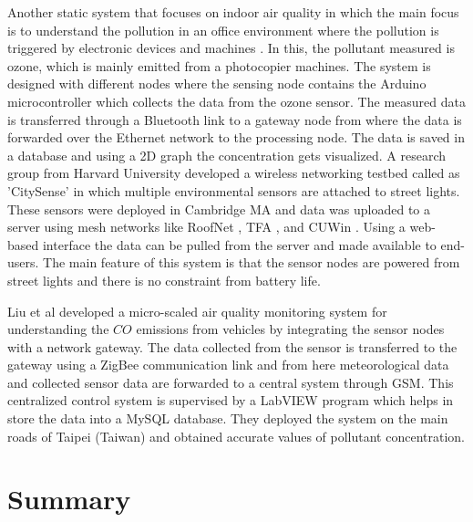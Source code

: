 Another static system that focuses on indoor air quality in which the main focus is to understand the pollution in an office environment where the pollution is triggered by electronic devices and machines \cite{Firdhous2017}. In this, the pollutant measured is ozone, which is mainly emitted from a photocopier machines. The system is designed with different nodes where the sensing node contains the Arduino microcontroller which collects the data from the ozone sensor. The measured data is transferred through a Bluetooth link to a gateway node from where the data is forwarded over the Ethernet network to the processing node. The data is saved in a database and using a 2D graph the concentration gets visualized. A research group from Harvard University developed a wireless networking testbed called as 'CitySense' \cite{Murty2008} in which multiple environmental sensors are attached to street lights. These sensors were deployed in Cambridge MA and data was uploaded to a server using mesh networks like RoofNet \cite{Bicket2005}, TFA \cite{Camp2006}, and CUWin \cite{cuwin2006}. Using a web-based interface the data can be pulled from the server and made available to end-users. The main feature of this system is that the sensor nodes are powered from street lights and there is no constraint from battery life.
\par
Liu et al \cite{Liu2011} developed a micro-scaled air quality monitoring system for understanding the $CO$ emissions from vehicles by integrating the sensor nodes with a network gateway. The data collected from the sensor is transferred to the gateway using a ZigBee communication link and from here meteorological data and collected sensor data are forwarded to a central system through GSM. This centralized control system is supervised by a LabVIEW \cite{INSTRUMENTS2013} program which helps in store the data into a MySQL database. They deployed the system on the main roads of Taipei (Taiwan) and obtained accurate values of pollutant concentration.


 \section{Summary}



